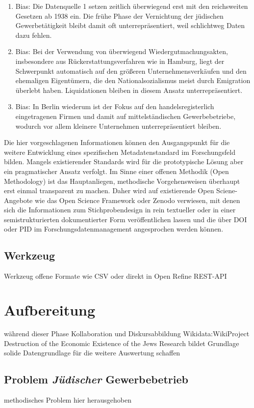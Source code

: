 \begin{enumerate}
    \item Bias: Die Datenquelle 1 setzen zeitlich überwiegend erst mit den reichsweiten Gesetzen ab 1938 ein. Die frühe Phase der Vernichtung der jüdischen Gewerbetätigkeit bleibt damit oft unterrepräsentiert, weil schlichtweg Daten dazu fehlen.
    \item Bias: Bei der Verwendung von überwiegend Wiedergutmachungsakten, insbesondere aus Rückerstattungsverfahren wie in Hamburg, liegt der Schwerpunkt automatisch auf den größeren Unternehmensverkäufen und den ehemaligen Eigentümern, die den Nationalsozialismus meist durch Emigration überlebt haben. Liquidationen bleiben in diesem Ansatz unterrepräsentiert. 
    \item Bias: In Berlin wiederum ist der Fokus auf den handelsregisterlich eingetragenen Firmen und damit auf mittelständischen Gewerbebetriebe, wodurch vor allem kleinere Unternehmen unterrepräsentiert bleiben.  
\end{enumerate}

Die hier vorgeschlagenen Informationen können den Ausgangspunkt für die weitere Entwicklung eines spezifischen Metadatenstandard im Forschungsfeld bilden. Mangels existierender Standards wird für die prototypische Lösung aber ein pragmatischer Ansatz verfolgt. Im Sinne einer offenen Methodik (Open Methodology) ist das Hauptanliegen, methodische Vorgehensweisen überhaupt erst einmal transparent zu machen. Daher wird auf existierende Open Sciene-Angebote wie das Open Science Framework oder Zenodo verwiesen, mit denen sich die Informationen zum Stichprobendesign in rein textueller oder in einer semistrukturierten dokumentierter Form veröffentlichen lassen und die über DOI oder PID im Forschungsdatenmanagement angesprochen werden können. 


\subsection{Werkzeug}
Werkzeug 
offene Formate wie CSV oder direkt in Open Refine
REST-API

\section{Aufbereitung}
während dieser Phase Kollaboration und Diskursabbildung
Wikidata:WikiProject Destruction of the Economic Existence of the Jews Research bildet Grundlage
solide Datengrundlage für die weitere Auswertung schaffen
\subsection{Problem \textit{Jüdischer} Gewerbebetrieb}
methodisches Problem hier herausgehoben

